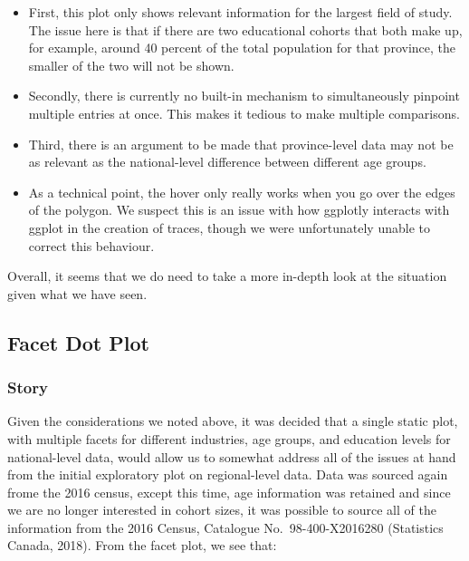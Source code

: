 \documentclass[]{article}
\providecommand{\tightlist}{%
  \setlength{\itemsep}{0pt}\setlength{\parskip}{0pt}}
\begin{document}
\begin{itemize}
\tightlist
\item
  First, this plot only shows relevant information for the largest field
  of study. The issue here is that if there are two educational cohorts
  that both make up, for example, around 40 percent of the total
  population for that province, the smaller of the two will not be
  shown.
\item
  Secondly, there is currently no built-in mechanism to simultaneously
  pinpoint multiple entries at once. This makes it tedious to make
  multiple comparisons.
\item
  Third, there is an argument to be made that province-level data may
  not be as relevant as the national-level difference between different
  age groups.
\item
  As a technical point, the hover only really works when you go over the
  edges of the polygon. We suspect this is an issue with how ggplotly
  interacts with ggplot in the creation of traces, though we were
  unfortunately unable to correct this behaviour.
\end{itemize}

Overall, it seems that we do need to take a more in-depth look at the
situation given what we have seen.

\hypertarget{facet-dot-plot}{%
\subsection{Facet Dot Plot}\label{facet-dot-plot}}

\hypertarget{story-4}{%
\subsubsection{Story}\label{story-4}}

Given the considerations we noted above, it was decided that a single
static plot, with multiple facets for different industries, age groups,
and education levels for national-level data, would allow us to somewhat
address all of the issues at hand from the initial exploratory plot on
regional-level data. Data was sourced again frome the 2016 census,
except this time, age information was retained and since we are no
longer interested in cohort sizes, it was possible to source all of the
information from the 2016 Census, Catalogue No.~98-400-X2016280
(Statistics Canada, 2018). From the facet plot, we see that:
\end{document}
